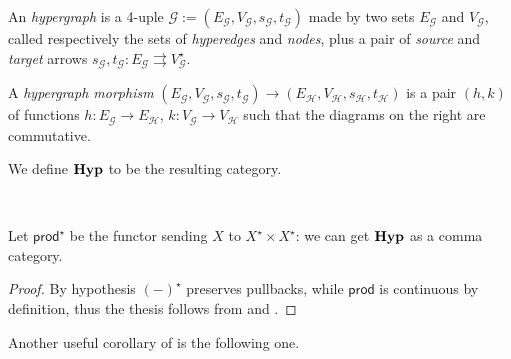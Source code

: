 \documentclass[a4paper,UKenglish,cleveref,pdftex,thm-restate,numberwithinsect]{lipics-v2021}
\newcommand{\Set}{\mathbf{Set}}
\def\E{\textbf {\textup{E}}}
\newcommand{\catname}[1]{\textbf{\textup{#1}}}
\newcommand{\hyp}{\catname{Hyp}}
\newcommand{\pro}{\mathsf{prod}}
\newcommand{\comma}[2]{#1\hspace{1pt} {\downarrow}#2}
\newcommand{\id}[1]{\mathsf{id}_{#1}}
\begin{document}
\noindent 
\parbox{10.8cm}{\begin{definition}An \emph{hypergraph} is a 4-uple $\mathcal{G}:=(E_\mathcal{G}, V_\mathcal{G}, s_\mathcal{G}, t_\mathcal{G})$ made by two sets $E_\mathcal{G}$ and $V_\mathcal{G}$, called respectively the sets of \emph{hyperedges} and \emph{nodes}, plus a pair of \emph{source} and \emph{target} arrows  $s_\mathcal{G}, t_\mathcal{G}\colon E_\mathcal{G}\rightrightarrows V_\mathcal{G}^\star$. 
		
\hspace{10pt} A \emph{hypergraph morphism} $(E_\mathcal{G}, V_\mathcal{G}, s_\mathcal{G}, t_\mathcal{G})\to (E_\mathcal{H}, V_\mathcal{H}, s_\mathcal{H}, t_\mathcal{H})$ is a pair $(h,k)$ of functions $h\colon E_\mathcal{G}\to E_\mathcal{H}$, $k\colon V_\mathcal{G}\to V_\mathcal{H}$ such that the diagrams on the right are commutative.

\hspace{10pt}	We define $\hyp$ to be the resulting category.
\end{definition}}\hfill\parbox{3cm}{ \hspace{1pt}\\  }

Let $\pro^\star$ be the functor sending $X$ to $X^\star\times X^\star$: we can get $\hyp$ as a comma category.


\begin{proof}
	By hypothesis $(-)^\star$ preserves pullbacks, while $\pro$ is continuous by definition, thus the thesis follows from   and .   
\end{proof}

Another useful corollary of  is the following one.
\end{document}
